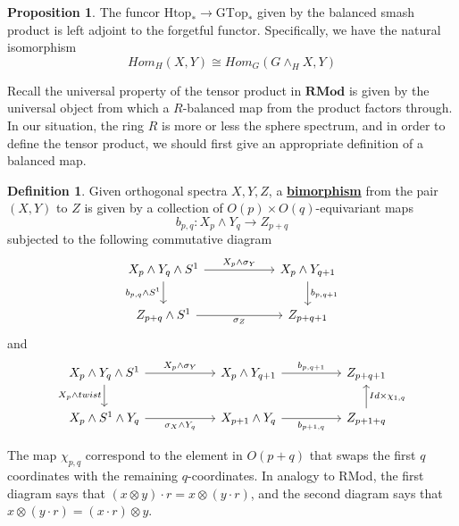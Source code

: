 \documentclass{article}
\theoremstyle{definition}
\theoremstyle{definition}
\newtheorem{definition}{Definition}[theorem]
\theoremstyle{definition}
\theoremstyle{definition}
\newtheorem{proposition}{Proposition}[theorem]
\theoremstyle{definition}
\theoremstyle{definition}
\theoremstyle{definition}
\begin{document}
\begin{tcolorbox}[colback=blue!5!white,colframe=blue!30!white]
\begin{proposition}
The funcor $\textrm{Htop}_*\to \textrm{GTop}_*$ given by the balanced smash product is left adjoint to the forgetful functor. Specifically, we have the natural isomorphism
\[Hom_H(X,Y)\cong Hom_G(G\wedge_H X, Y)\]
\end{proposition}
\end{tcolorbox}
Recall the universal property of the tensor product in $\textbf{RMod}$ is given by the universal object from which a $R$-balanced map from the product factors through. In our situation, the ring $R$ is more or less the sphere spectrum, and in order to define the tensor product, we should first give an appropriate definition of a balanced map.


\begin{tcolorbox}[colback=purple!5!white,colframe=purple!75!black]
\begin{definition}
    Given orthogonal spectra $X,Y, Z$, a \underline{\textbf{bimorphism}} from the pair $(X,Y)$ to $Z$ is given by a collection of $O(p)\times O(q)$-equivariant maps 
    \[b_{p,q}: X_p\wedge Y_q\to Z_{p+q}\] 
    subjected to the following commutative diagram
    \[\begin{tikzcd}
        {X_p\wedge Y_q\wedge S^1} && {X_{p}\wedge Y_{q+1}} \\
        {Z_{p+q}\wedge S^1} & {} & {Z_{p+q+1}}
        \arrow["{X_p\wedge \sigma_{Y}}", from=1-1, to=1-3]
        \arrow["{b_{p,q}\wedge S^1}"', from=1-1, to=2-1]
        \arrow["{b_{p,q+1}}", from=1-3, to=2-3]
        \arrow["{\sigma_{Z}}"', from=2-1, to=2-3]
    \end{tikzcd}\]
    and 
    \[\begin{tikzcd}
        {X_p\wedge Y_q\wedge S^1} && {X_{p}\wedge Y_{q+1}} && {Z_{p+q+1}} \\
        {X_p\wedge S^1\wedge Y_q} & {} & {X_{p+1}\wedge Y_{q}} && {Z_{p+1+q}}
        \arrow["{X_p\wedge \sigma_{Y}}", from=1-1, to=1-3]
        \arrow["{X_p\wedge twist}"', from=1-1, to=2-1]
        \arrow["{b_{p,q+1}}", from=1-3, to=1-5]
        \arrow["{\sigma_X\wedge Y_q}"', from=2-1, to=2-3]
        \arrow["{b_{p+1,q}}"', from=2-3, to=2-5]
        \arrow["{Id\times \chi_{1,q}}"', from=2-5, to=1-5]
    \end{tikzcd}\]
\end{definition}
\end{tcolorbox}
The map $\chi_{p,q}$ correspond to the element in $O(p+q)$ that swaps the first $q$ coordinates with the remaining $q$-coordinates. In analogy to \textrm{RMod}, the first diagram says that $(x\otimes y)\cdot r=x\otimes (y\cdot r)$, and the second diagram says that $x\otimes (y\cdot r)=(x\cdot r)\otimes y$. 
\end{document}
